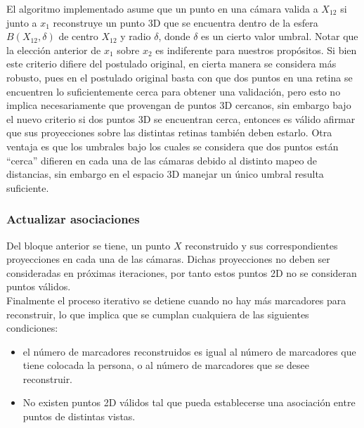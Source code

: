 El algoritmo implementado asume que un punto en una cámara valida a $X_{12}$ si junto a $x_1$ reconstruye un punto 3D que se encuentra dentro de la esfera $B(X_{12}, \delta)$ de centro $X_{12}$ y radio $\delta$, donde $\delta$ es un cierto valor umbral. Notar que la elección anterior de $x_1$ sobre $x_2$ es indiferente para nuestros propósitos. Si bien este criterio difiere del postulado original, en cierta manera se considera más robusto, pues en el postulado original basta con que dos puntos en una retina se encuentren lo suficientemente cerca para obtener una validación, pero esto no implica necesariamente que provengan de puntos 3D cercanos, sin embargo bajo el nuevo criterio si dos puntos 3D se encuentran cerca, entonces es válido afirmar que sus proyecciones sobre las distintas retinas también deben estarlo. Otra ventaja es que los umbrales bajo los cuales se considera que dos puntos están ``cerca'' difieren en cada una de las cámaras debido al distinto mapeo de distancias, sin embargo en el espacio 3D manejar un único umbral resulta suficiente.       

\subsubsection{Actualizar asociaciones}

Del bloque anterior se tiene, un punto $X$ reconstruido y sus correspondientes proyecciones en cada una de las cámaras. Dichas proyecciones no deben ser consideradas en próximas iteraciones, por tanto estos puntos 2D no se consideran puntos válidos.\\



Finalmente el proceso iterativo se detiene cuando no hay más marcadores para reconstruir, lo que implica que se cumplan cualquiera de las siguientes condiciones:\\
\begin{itemize}
\item el número de marcadores reconstruidos es igual al número de marcadores que tiene colocada la persona, o al número de marcadores que se desee reconstruir.

\item No existen puntos 2D válidos tal que pueda establecerse una asociación entre puntos de distintas vistas.
\end{itemize}


